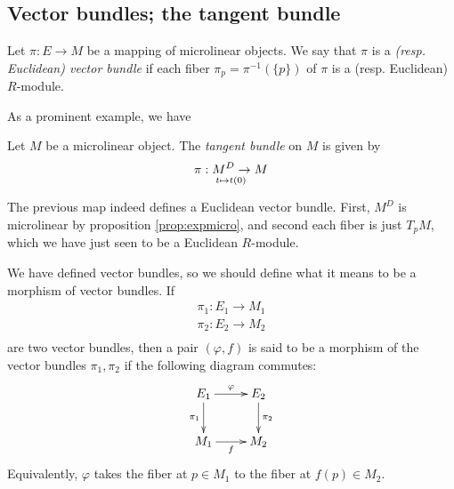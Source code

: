 \subsection{Vector bundles; the tangent bundle}

\begin{defn}
  Let \( \pi:E\to M \) be a mapping of microlinear objects. We say that \( \pi \) is a \emph{(resp. Euclidean) vector bundle} if each fiber \( \pi_p = \pi^{-1}(\{p\}) \) of \( \pi \) is a (resp. Euclidean) \( R \)-module.
\end{defn}

As a prominent example, we have

\begin{defn}
  Let \( M \) be a microlinear object. The \emph{tangent bundle} on \( M \) is given by
  \begin{equation*}
    \pi:M^D\to M \atop t\mapsto t(0)
  \end{equation*}
\end{defn}

The previous map indeed defines a Euclidean vector bundle. First, \( M^D \) is microlinear by proposition \ref{prop:expmicro}, and second each fiber is just \( T_pM \), which we have just seen to be a Euclidean \( R \)-module.

We have defined vector bundles, so we should define what it means to be a morphism of vector bundles. If
\begin{align*}
  \pi_1:E_1\to M_1 \\
  \pi_2:E_2\to M_2 \\
\end{align*}
are two vector bundles, then a pair \( (\varphi,f) \) is said to be a morphism of the vector bundles \( \pi_1,\pi_2 \) if the following diagram commutes:
\begin{equation*}
  \xymatrix{
    E_1 \ar[d]_{\pi_1} \ar[r]^\varphi & E_2 \ar[d]^{\pi_2} \\
    M_1                \ar[r]_f       & M_2
  }
\end{equation*}
Equivalently, \( \varphi \) takes the fiber at \( p\in M_1 \) to the fiber at \( f(p)\in M_2 \).

